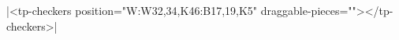\documentclass{article}
\begin{document}
\rawhtml|<tp-checkers position="W:W32,34,K46:B17,19,K5" draggable-pieces=""></tp-checkers>|
\end{document}
